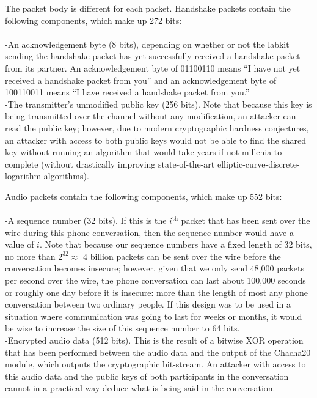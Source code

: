 \documentclass[a4paper]{report}
\begin{document}
The packet body is different for each packet. Handshake packets contain the following components, which make up 272 bits: \\ \\
-An acknowledgement byte (8 bits), depending on whether or not the labkit sending the handshake packet has yet successfully received a handshake packet from its partner. An acknowledgement byte of 01100110 means ``I have not yet received a handshake packet from you'' and an acknowledgement byte of 100110011 means ``I have received a handshake packet from you.''  \\
-The transmitter's unmodified public key (256 bits). Note that because this key is being transmitted over the channel without any modification, an attacker can read the public key; however, due to modern cryptographic hardness conjectures, an attacker with access to both public keys would not be able to find the shared key without running an algorithm that would take years if not millenia to complete (without drastically improving state-of-the-art elliptic-curve-discrete-logarithm algorithms).

Audio packets contain the following components, which make up 552 bits: \\ \\
-A sequence number (32 bits). If this is the $i^{\textrm{th}}$ packet that has been sent over the wire during this phone conversation, then the sequence number would have a value of $i$. Note that because our sequence numbers have a fixed length of 32 bits, no more than $2^{32} \approx $ 4 billion packets can be sent over the wire before the conversation becomes insecure; however, given that we only send 48,000 packets per second over the wire, the phone conversation can last about 100,000 seconds or roughly one day before it is insecure: more than the length of most any phone conversation between two ordinary people. If this design was to be used in a situation where communication was going to last for weeks or months, it would be wise to increase the size of this sequence number to 64 bits. \\
-Encrypted audio data (512 bits). This is the result of a bitwise XOR operation that has been performed between the audio data and the output of the Chacha20 module, which outputs the cryptographic bit-stream. An attacker with access to this audio data and the public keys of both participants in the conversation cannot in a practical way deduce what is being said in the conversation. \\
\end{document}
